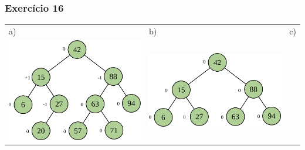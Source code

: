 \documentclass[aspectratio=169]{beamer}
\begin{document}
\begin{frame}[fragile]\frametitle{Exercício 16}
\begin{tabular}{lll}%
a) & b) & c)\\
\includegraphics[height=0.4\paperheight]{imagens/avl08c.png} &
\includegraphics[height=0.3\paperheight]{imagens/avl09c.png} &

\end{tabular}
\end{frame}
\end{document}
